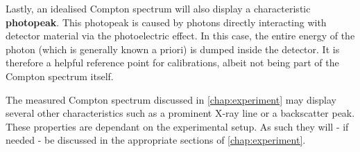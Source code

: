 Lastly, an idealised Compton spectrum will also display a characteristic 
\textbf{photopeak}. This photopeak is caused by photons directly interacting with 
detector material via the photoelectric effect. In this case, the entire energy of 
the photon (which is generally known a priori) is dumped inside the detector. It is 
therefore a helpful reference point for calibrations, albeit not being part of the 
Compton spectrum itself.

The measured Compton spectrum discussed in \autoref{chap:experiment} may display
several other characteristics such as a prominent X-ray line or a backscatter peak.
These properties are dependant on the experimental setup. As such they will -
if needed - be discussed in the appropriate sections of \autoref{chap:experiment}.
